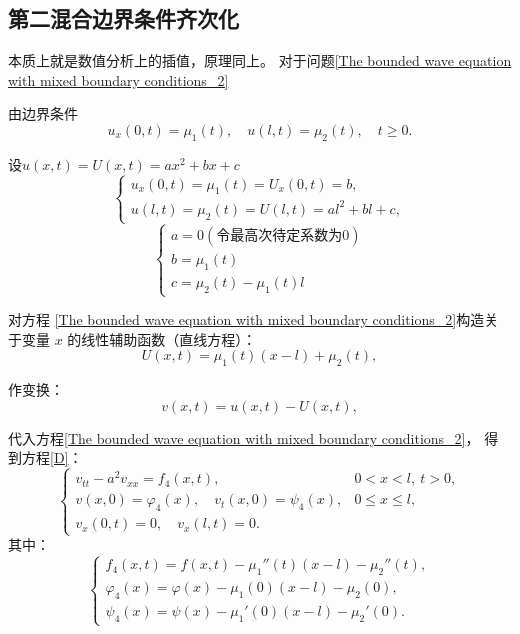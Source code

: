 \documentclass[12pt,a4paper]{article}
\numberwithin{subsection}{section}   %
\numberwithin{subsubsection}{subsection}
\theoremstyle{plain}
\theoremstyle{definition}
\theoremstyle{remark}
\theoremstyle{remark}
\begin{document}
	
		\subsection{第二混合边界条件齐次化}
	本质上就是数值分析上的插值，原理同上。
	对于问题\eqref{The bounded wave equation with mixed boundary conditions_2}
	
	由边界条件
	\begin{equation}
		u_x(0,t) = \mu_1(t), \quad u(l,t) = \mu_2(t), \quad t \geq 0.
	\end{equation}
	
	设$u(x, t)=U(x, t)=ax^2+bx+c$
	\[
	\begin{cases}
		u_x(0, t) = \mu_1(t) = U_x(0, t) = b, \\
		u(l, t) = \mu_2(t) = U(l, t) = al^2 + bl+c,
	\end{cases}
	\]
	\[
	\begin{cases}
		a = 0 (\text{令最高次待定系数为0})\\
	b =\mu_1(t) \\
	c = \mu_2(t)-\mu_1(t)l
	\end{cases}
	\]
	
	对方程 \eqref{The bounded wave equation with mixed boundary conditions_2}构造关于变量 \(x\) 的线性辅助函数（直线方程）：
	\begin{equation}
		U(x, t) = \mu_1(t)(x-l) + \mu_2(t) ,
	\end{equation}
	
	作变换：
	\begin{equation}
		v(x, t) = u(x, t) - U(x, t),
	\end{equation}
	
	代入方程\eqref{The bounded wave equation with mixed boundary conditions_2}，
	得到方程\eqref{D}：
	\begin{equation}\label{D}
		\begin{cases}
			v_{tt} - a^2 v_{xx} = f_4(x, t), & 0 < x < l, \ t > 0, \\
			v(x, 0) = \varphi_4(x), \quad v_t(x, 0) = \psi_4(x), & 0 \leq x \leq l, \\
			v_x(0, t) = 0, \quad v_x(l, t) = 0. &
		\end{cases}
	\end{equation}
	其中：
	\begin{equation}
		\begin{cases}
			f_4(x, t) = f(x, t) - \mu_1''(t) (x-l)- \mu_2''(t) , \\
			\varphi_4(x) = \varphi(x) - \mu_1(0)(x-l)- \mu_2(0), \\
			\psi_4(x) = \psi(x) - \mu_1'(0)(x-l) - \mu_2'(0).
		\end{cases}
	\end{equation}
	
\end{document}
